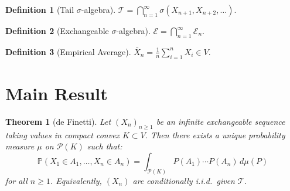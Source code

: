 \documentclass[11pt,a4paper]{article}
\theoremstyle{definition}
\newtheorem{definition}{Definition}[section]
\theoremstyle{plain}
\newtheorem{theorem}{Theorem}[section]
\begin{document}
\begin{definition}[Tail $\sigma$-algebra]
$\mathcal{T} = \bigcap_{n=1}^{\infty} \sigma(X_{n+1}, X_{n+2}, \ldots)$.
\end{definition}

\begin{definition}[Exchangeable $\sigma$-algebra]
$\mathcal{E} = \bigcap_{n=1}^{\infty} \mathcal{E}_n$.
\end{definition}

\begin{definition}[Empirical Average]
$\bar{X}_n = \frac{1}{n}\sum_{i=1}^{n} X_i \in V$.
\end{definition}

\section{Main Result}

\begin{theorem}[de Finetti]
Let $(X_n)_{n \geq 1}$ be an infinite exchangeable sequence taking values in compact convex $K \subset V$. Then there exists a unique probability measure $\mu$ on $\mathcal{P}(K)$ such that:
\[
\mathbb{P}(X_1 \in A_1, \ldots, X_n \in A_n) = \int_{\mathcal{P}(K)} P(A_1) \cdots P(A_n) \, d\mu(P)
\]
for all $n \geq 1$. Equivalently, $(X_n)$ are conditionally i.i.d.\ given $\mathcal{T}$.
\end{theorem}
\end{document}
